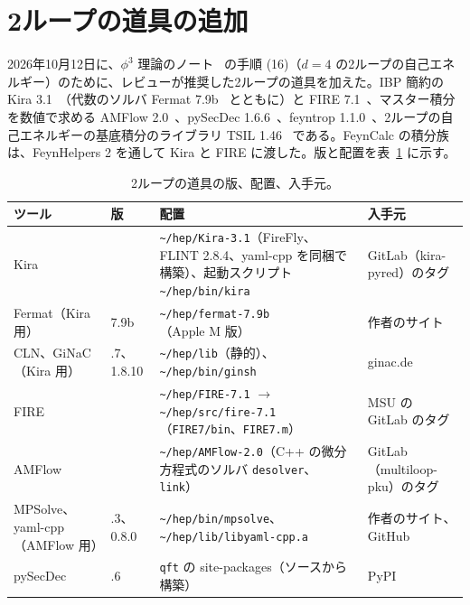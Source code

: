 \documentclass[a4paper,10pt]{ltjsarticle}
\begin{document}
\section{2ループの道具の追加}\label{sec:twoloop}

2026年10月12日に、$\phi^3$ 理論のノート~\cite{phi3note} の手順 (16)（$d=4$ の2ループの自己エネルギー）のために、レビューが推奨した2ループの道具を加えた。IBP 簡約の Kira 3.1~\cite{kira3}（代数のソルバ Fermat 7.9b~\cite{url:fermat} とともに）と FIRE 7.1~\cite{fire7}、マスター積分を数値で求める AMFlow 2.0~\cite{amflow,amflow2}、pySecDec 1.6.6~\cite{pysecdec}、feyntrop 1.1.0~\cite{feyntrop}、2ループの自己エネルギーの基底積分のライブラリ TSIL 1.46~\cite{tsil} である。FeynCalc の積分族は、FeynHelpers 2 を通して Kira と FIRE に渡した。版と配置を表~\ref{tab:twoloop} に示す。

\begin{table}[hbp]
\centering\small
\caption{2ループの道具の版、配置、入手元。}
\label{tab:twoloop}
\begin{tabularx}{\linewidth}{>{\raggedright\arraybackslash}p{3.4cm}>{\raggedright\arraybackslash}p{1.2cm}>{\raggedright\arraybackslash}X>{\raggedright\arraybackslash}p{4.2cm}}
\toprule
\textbf{ツール} & \textbf{版} & \textbf{配置} & \textbf{入手元} \\
\midrule
Kira & 3.1 & \texttt{\textasciitilde/hep/Kira-3.1}（FireFly、FLINT 2.8.4、yaml-cpp を同梱で構築）、起動スクリプト \texttt{\textasciitilde/hep/bin/kira} & GitLab（kira-pyred）のタグ~\cite{kira3,url:kira} \\
Fermat（Kira 用） & 7.9b & \texttt{\textasciitilde/hep/fermat-7.9b}（Apple M 版） & 作者のサイト~\cite{url:fermat} \\
CLN、GiNaC（Kira 用） & 1.3.7、1.8.10 & \texttt{\textasciitilde/hep/lib}（静的）、\texttt{\textasciitilde/hep/bin/ginsh} & ginac.de~\cite{url:ginac} \\
FIRE & 7.1 & \texttt{\textasciitilde/hep/FIRE-7.1} $\to$ \texttt{\textasciitilde/hep/src/fire-7.1}（\texttt{FIRE7/bin}、\texttt{FIRE7.m}） & MSU の GitLab のタグ~\cite{fire7,url:fire} \\
AMFlow & 2.0 & \texttt{\textasciitilde/hep/AMFlow-2.0}（C++ の微分方程式のソルバ \texttt{desolver}、\texttt{link}） & GitLab（multiloop-pku）のタグ~\cite{amflow2,url:amflow} \\
MPSolve、yaml-cpp（AMFlow 用） & 3.2.3、0.8.0 & \texttt{\textasciitilde/hep/bin/mpsolve}、\texttt{\textasciitilde/hep/lib/libyaml-cpp.a} & 作者のサイト、GitHub \\
pySecDec & 1.6.6 & \texttt{qft} の site-packages（ソースから構築） & PyPI~\cite{pysecdec,url:pysecdec} \\

\end{tabularx}
\end{table}
\end{document}

